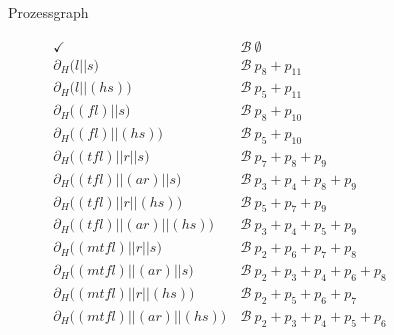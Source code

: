 \documentclass[a4paper]{scrartcl}
\begin{document}
\begin{enumerate}
\begin{sidewaysfigure}[h]
{
            }
            \caption{Prozessgraph}
            \label{fig:process}
        \end{sidewaysfigure}

         \begin{equation}
            \begin{split}
                \checkmark \ &\mathcal{B}\  \emptyset \\
                \partial_H \Big( l || s \Big) \ &\mathcal{B}\  p_8 + p_{11} \\
                \partial_H \Big( l || (hs) \Big) \ &\mathcal{B}\  p_5 + p_{11} \\
                \partial_H \Big( (fl) || s \Big) \ &\mathcal{B}\  p_8 + p_{10} \\
                \partial_H \Big( (fl) || (hs) \Big) \ &\mathcal{B}\  p_5 + p_{10} \\
                \partial_H \Big( (tfl) || r || s \Big) \ &\mathcal{B}\  p_7 + p_8 + p_9 \\
                \partial_H \Big( (tfl) || (ar) || s \Big) \ &\mathcal{B}\  p_3 + p_4 + p_8 + p_9 \\
                \partial_H \Big( (tfl) || r || (hs) \Big) \ &\mathcal{B}\  p_5 + p_7 + p_9 \\
                \partial_H \Big( (tfl) || (ar) || (hs) \Big) \ &\mathcal{B}\  p_3 + p_4 + p_5 + p_9 \\
                \partial_H \Big( (mtfl) || r || s \Big) \ &\mathcal{B}\  p_2 + p_6 + p_7 + p_8 \\
                \partial_H \Big( (mtfl) || (ar) || s \Big) \ &\mathcal{B}\  p_2 + p_3 + p_4 + p_6 + p_8 \\
                \partial_H \Big( (mtfl) || r || (hs) \Big) \ &\mathcal{B}\  p_2 + p_5 + p_6 + p_7 \\
                \partial_H \Big( (mtfl) || (ar) || (hs) \Big) \ &\mathcal{B}\  p_2 + p_3 + p_4 + p_5 + p_6 \\

\end{split}
\end{equation}
\end{enumerate}
\end{document}

